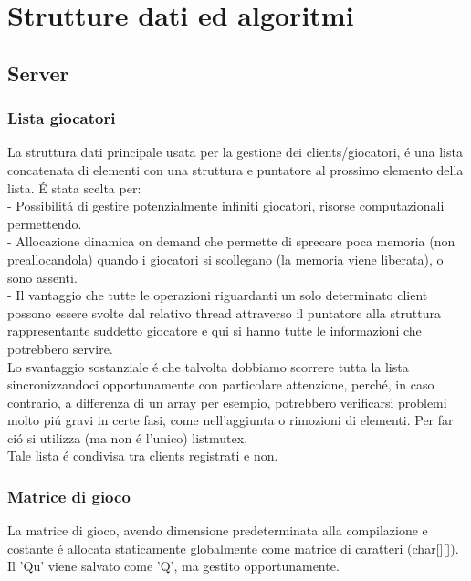 \chapter{Strutture dati ed algoritmi}

\section{Server}

\subsection{Lista giocatori}

La struttura dati principale usata per la gestione dei clients/giocatori, \'e una lista concatenata di elementi con una struttura e puntatore al prossimo elemento della lista. \'E stata scelta per:
 \\ - Possibilit\'a di gestire potenzialmente infiniti giocatori, risorse computazionali permettendo.
 \\ - Allocazione dinamica on demand che permette di sprecare poca memoria (non preallocandola) quando i giocatori si scollegano (la memoria viene liberata), o sono assenti.
 \\ - Il vantaggio che tutte le operazioni riguardanti un solo determinato client possono essere svolte dal relativo thread attraverso il puntatore alla struttura rappresentante suddetto giocatore e qui si hanno tutte le informazioni che potrebbero servire.
  \\
 Lo svantaggio sostanziale \'e che talvolta dobbiamo scorrere tutta la lista sincronizzandoci opportunamente con particolare attenzione, perch\'e, in caso contrario, a differenza di un array per esempio, potrebbero verificarsi problemi molto pi\'u gravi in certe fasi, come nell'aggiunta o rimozioni di elementi. Per far ci\'o si utilizza (ma non \'e l'unico) listmutex.
 \\
 Tale lista \'e condivisa tra clients registrati e non.
 \\
 
\subsection{Matrice di gioco}

La matrice di gioco, avendo dimensione predeterminata alla compilazione e costante \'e allocata staticamente globalmente come matrice di caratteri (char[][]). Il 'Qu' viene salvato come 'Q', ma gestito opportunamente.
\\

